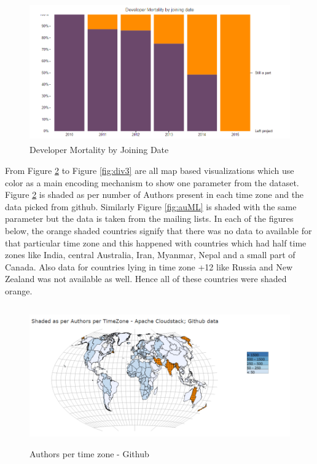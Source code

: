 \documentclass[seploa]{beavtex}
\begin{document}
\begin{figure}[H]
\centering
\includegraphics[width=130mm,height=60mm]{image3.PNG}
\caption{Developer Mortality by Joining Date}
\label{fig:devMort}
\end{figure}

From Figure \ref{fig:auHub} to Figure \ref{fig:div3} are all map based visualizations which use color as a main encoding mechanism to show one parameter from the dataset. Figure \ref{fig:auHub} is shaded as per number of Authors present in each time zone and the data picked from github. Similarly Figure \ref{fig:auML} is shaded with the same parameter but the data is taken from the mailing lists. In each of the figures below, the orange shaded countries signify that there was no data to available for that particular time zone and this happened with countries which had half time zones like India, central Australia, Iran, Myanmar, Nepal and a small part of Canada. Also data for countries lying in time zone +12 like Russia and New Zealand was not available as well. Hence all of these countries were shaded orange.

\begin{figure}[H]
\centering
\includegraphics[width=130mm,height=60mm]{image4.PNG}
\caption{Authors per time zone - Github}
\label{fig:auHub}
\end{figure}
\end{document}
